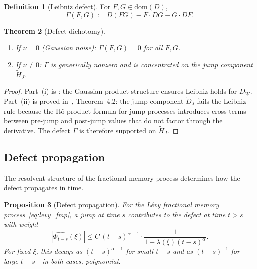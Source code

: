 \documentclass[11pt]{article}
\newtheorem{theorem}{Theorem}[section]
\newtheorem{proposition}[theorem]{Proposition}
\theoremstyle{definition}
\newtheorem{definition}[theorem]{Definition}
\theoremstyle{remark}
\begin{document}
\begin{definition}[Leibniz defect]
\label{def:defect}
For $F, G \in \mathrm{dom}(D)$,
\begin{equation}\label{eq:defect}
\Gamma(F,G) := D(FG) - F \cdot DG - G \cdot DF.
\end{equation}
\end{definition}

\begin{theorem}[Defect dichotomy]
\label{thm:defect_dichotomy}
\leavevmode
\begin{enumerate}[label=(\roman*)]
\item If $\nu = 0$ (Gaussian noise):
  $\Gamma(F,G) = 0$ for all $F, G$.
\item If $\nu \neq 0$: $\Gamma$ is generically
  nonzero and is concentrated on the jump component
  $\widetilde{H}_J$.
\end{enumerate}
\end{theorem}

\begin{proof}
Part~(i) is : the Gaussian
product structure ensures Leibniz holds for $D_W$.
Part~(ii) is proved in~\cite{fontes2026banach},
Theorem~4.2: the jump component $\widetilde{D}_J$
fails the Leibniz rule because the It\^o product
formula for jump processes introduces cross terms
between pre-jump and post-jump values that do not
factor through the derivative.  The defect $\Gamma$
is therefore supported on $\widetilde{H}_J$.
\end{proof}

\subsection{Defect propagation}

The resolvent structure of the fractional memory
process determines how the defect propagates in time.

\begin{proposition}[Defect propagation]
\label{prop:defect_propagation}
For the L\'evy fractional memory
process~\eqref{eq:levy_fmp}, a jump at time $s$
contributes to the defect at time $t > s$ with weight
\begin{equation}\label{eq:defect_weight}
|\widehat{\Phi_{t-s}}(\xi)|
\leq C\,(t-s)^{\alpha-1}
\cdot \frac{1}{1 + \lambda(\xi)(t-s)^\alpha}.
\end{equation}
For fixed $\xi$, this decays as $(t-s)^{\alpha-1}$
for small $t - s$ and as $(t-s)^{-1}$ for large
$t - s$---in both cases, polynomial.
\end{proposition}
\end{document}
